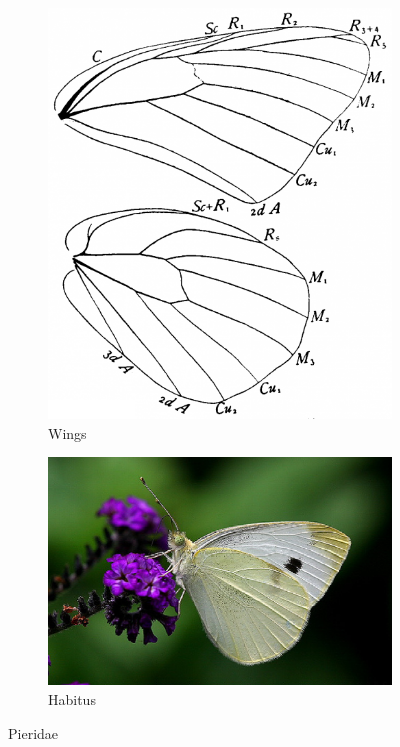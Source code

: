 \documentclass[letterpaper, 11pt]{article}
\begin{document}
\begin{figure}[ht!]
    \centering
    \begin{subfigure}[ht!]{0.25\textwidth}
        \includegraphics[width=\textwidth]{PieridWings}
        \caption{Wings \citep[Fig. 342]{comstock1918wings}}
        \label{fig:pierid1}
    \end{subfigure}
    \qquad %
    \begin{subfigure}[ht!]{0.5\textwidth}
        \includegraphics[width=\textwidth]{image11}
        \caption{Habitus}
        \label{fig:pierid2}
    \end{subfigure}
    \caption{Pieridae}\label{fig:pierids}
\end{figure}
\end{document}
